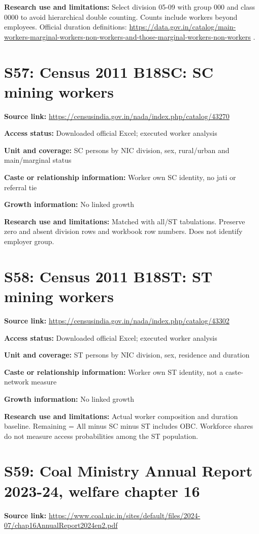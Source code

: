 \documentclass[11pt,a4paper]{report}
\begin{document}
\textbf{Research use and limitations:} Select division 05-09 with group 000 and class 0000 to avoid hierarchical double counting. Counts include workers beyond employees. Official duration definitions: \url{https://data.gov.in/catalog/main-workers-marginal-workers-non-workers-and-those-marginal-workers-non-workers} .

\section{S57: Census 2011 B18SC: SC mining workers}\hypertarget{S57}{}
\textbf{Source link:} \url{https://censusindia.gov.in/nada/index.php/catalog/43270}

\textbf{Access status:} Downloaded official Excel; executed worker analysis

\textbf{Unit and coverage:} SC persons by NIC division, sex, rural/\allowbreak{}urban and main/\allowbreak{}marginal status

\textbf{Caste or relationship information:} Worker own SC identity, no jati or referral tie

\textbf{Growth information:} No linked growth

\textbf{Research use and limitations:} Matched with all/\allowbreak{}ST tabulations. Preserve zero and absent division rows and workbook row numbers. Does not identify employer group.

\section{S58: Census 2011 B18ST: ST mining workers}\hypertarget{S58}{}
\textbf{Source link:} \url{https://censusindia.gov.in/nada/index.php/catalog/43302}

\textbf{Access status:} Downloaded official Excel; executed worker analysis

\textbf{Unit and coverage:} ST persons by NIC division, sex, residence and duration

\textbf{Caste or relationship information:} Worker own ST identity, not a caste-network measure

\textbf{Growth information:} No linked growth

\textbf{Research use and limitations:} Actual worker composition and duration baseline. Remaining = All minus SC minus ST includes OBC. Workforce shares do not measure access probabilities among the ST population.

\section{S59: Coal Ministry Annual Report 2023-24, welfare chapter 16}\hypertarget{S59}{}
\textbf{Source link:} \url{https://www.coal.nic.in/sites/default/files/2024-07/chap16AnnualReport2024en2.pdf}
\end{document}
